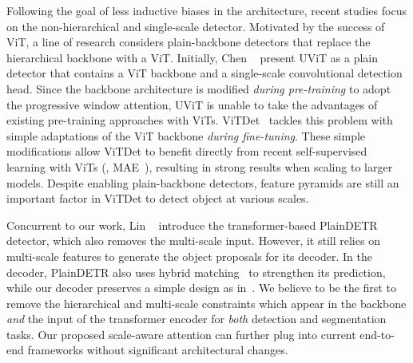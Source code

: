 
 Following the goal of less inductive biases in the architecture, recent studies focus on the non-hierarchical and single-scale detector. Motivated by the success of ViT, a line of research considers plain-backbone detectors that replace the hierarchical backbone with a ViT. Initially, Chen \etal~\cite{chen2022uvit} present UViT as a plain detector that contains a ViT backbone and a single-scale convolutional detection head. Since the backbone architecture is modified \textit{during pre-training} to adopt the progressive window attention, UViT is unable to take the advantages of existing pre-training approaches with ViTs. ViTDet~\cite{li2022vitdet} tackles this problem with simple adaptations of the ViT backbone \textit{during fine-tuning}. These simple modifications allow ViTDet to benefit directly from recent self-supervised learning with ViTs (\ie, MAE~\cite{he2022mae}), resulting in strong results when scaling to larger models. Despite enabling plain-backbone detectors, feature pyramids are still an important factor in ViTDet to detect object at various scales.

Concurrent to our work, Lin \etal~\cite{lin2023plaindetr} introduce the transformer-based PlainDETR detector, which also removes the multi-scale input. However, it still relies on multi-scale features to generate the object proposals for its decoder. In the decoder, PlainDETR also uses hybrid matching~\cite{jia2023hybridmatching} to strengthen its prediction, while our decoder preserves a simple design as in~\cite{zhu2021deformable,nguyen2022boxer}. We believe to be the first to remove
the hierarchical and multi-scale constraints which appear in the backbone \textit{and} the input of the transformer encoder for \textit{both} detection and segmentation tasks. Our proposed scale-aware attention can further plug into current end-to-end frameworks without significant architectural changes. %

